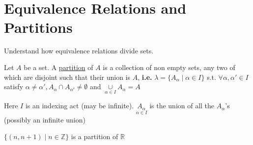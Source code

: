 \documentclass[10pt]{article}
\begin{document}
	\section{Equivalence Relations and Partitions}
	\begin{description}
		\item[Task:] Understand how equivalence relations divide sets.
		\item[Definition:] Let $A$ be a set. A \underline{partition} of $A$ is a collection of non empty sets, any two of which are disjoint such that their union is $A$, \textbf{i.e.} $\lambda = \{A_\alpha \mid \alpha \in I \}$ s.t. $\forall \alpha , \alpha ' \in I$ satisfy $\alpha \neq \alpha ', A_\alpha \cap A_{\alpha '} \neq \emptyset$ and $\underset{\alpha \in I}{\cup} A_\alpha = A$
		\item Here $I$ is an indexing act (may be infinite). $\underset{\alpha \in I}{A_\alpha}$ is the union of all the $A_\alpha$'s (possibly an infinite union)
		\item[Example] $\{(n, n+1) \mid n \in \mathbb{Z} \}$ is a partition of $\mathbb{R}$
		\begin{figure}[h]
			\centering
\end{figure}
\end{description}
\end{document}
